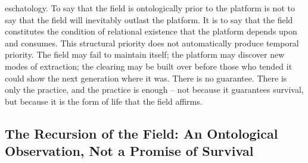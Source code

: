 eschatology. To say that the field is ontologically prior to the platform is not to say that the field will inevitably outlast the platform. It is to say that the field constitutes the condition of relational existence that the platform depends upon and consumes. This structural priority does not automatically produce temporal priority. The field may fail to maintain itself; the platform may discover new modes of extraction; the clearing may be built over before those who tended it could show the next generation where it was. There is no guarantee. There is only the practice, and the practice is enough – not because it guarantees survival, but because it is the form of life that the field affirms.

\subsection{The Recursion of the Field: An Ontological Observation, Not a Promise of Survival}


